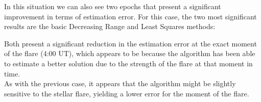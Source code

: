 In this situation we can also see two epochs that present a significant improvement in terms of estimation error. For this case, the two most significant results are the basic Decreasing Range and Least Squares methods:

Both present a significant reduction in the estimation error at the exact moment of the flare (4:00 UT), which appears to be because the algorithm has been able to estimate a better solution due to the strength of the flare at that moment in time. \\

As with the previous case, it appears that the algorithm might be slightly sensitive to the stellar flare, yielding a lower error for the moment of the flare.



















